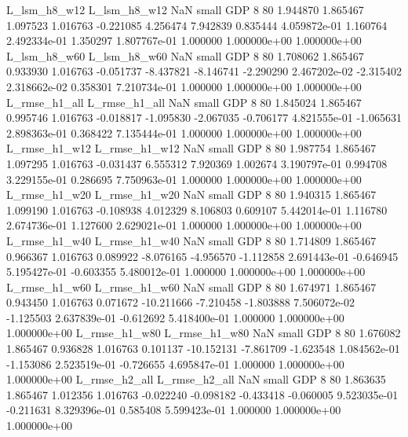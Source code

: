   L_lsm_h8_w12   L_lsm_h8_w12                   NaN      small      GDP                 8 80 1.944870       1.865467 1.097523       1.016763   -0.221085      4.256474      7.942839     0.835444   4.059872e-01  1.160764 2.492334e-01     1.350297   1.807767e-01            1.000000    1.000000e+00        1.000000e+00
  L_lsm_h8_w60   L_lsm_h8_w60                   NaN      small      GDP                 8 80 1.708062       1.865467 0.933930       1.016763   -0.051737     -8.437821     -8.146741    -2.290290   2.467202e-02 -2.315402 2.318662e-02     0.358301   7.210734e-01            1.000000    1.000000e+00        1.000000e+00
 L_rmse_h1_all  L_rmse_h1_all                   NaN      small      GDP                 8 80 1.845024       1.865467 0.995746       1.016763   -0.018817     -1.095830     -2.067035    -0.706177   4.821555e-01 -1.065631 2.898363e-01     0.368422   7.135444e-01            1.000000    1.000000e+00        1.000000e+00
 L_rmse_h1_w12  L_rmse_h1_w12                   NaN      small      GDP                 8 80 1.987754       1.865467 1.097295       1.016763   -0.031437      6.555312      7.920369     1.002674   3.190797e-01  0.994708 3.229155e-01     0.286695   7.750963e-01            1.000000    1.000000e+00        1.000000e+00
 L_rmse_h1_w20  L_rmse_h1_w20                   NaN      small      GDP                 8 80 1.940315       1.865467 1.099190       1.016763   -0.108938      4.012329      8.106803     0.609107   5.442014e-01  1.116780 2.674736e-01     1.127600   2.629021e-01            1.000000    1.000000e+00        1.000000e+00
 L_rmse_h1_w40  L_rmse_h1_w40                   NaN      small      GDP                 8 80 1.714809       1.865467 0.966367       1.016763    0.089922     -8.076165     -4.956570    -1.112858   2.691443e-01 -0.646945 5.195427e-01    -0.603355   5.480012e-01            1.000000    1.000000e+00        1.000000e+00
 L_rmse_h1_w60  L_rmse_h1_w60                   NaN      small      GDP                 8 80 1.674971       1.865467 0.943450       1.016763    0.071672    -10.211666     -7.210458    -1.803888   7.506072e-02 -1.125503 2.637839e-01    -0.612692   5.418400e-01            1.000000    1.000000e+00        1.000000e+00
 L_rmse_h1_w80  L_rmse_h1_w80                   NaN      small      GDP                 8 80 1.676082       1.865467 0.936828       1.016763    0.101137    -10.152131     -7.861709    -1.623548   1.084562e-01 -1.153086 2.523519e-01    -0.726655   4.695847e-01            1.000000    1.000000e+00        1.000000e+00
 L_rmse_h2_all  L_rmse_h2_all                   NaN      small      GDP                 8 80 1.863635       1.865467 1.012356       1.016763   -0.022240     -0.098182     -0.433418    -0.060005   9.523035e-01 -0.211631 8.329396e-01     0.585408   5.599423e-01            1.000000    1.000000e+00        1.000000e+00

